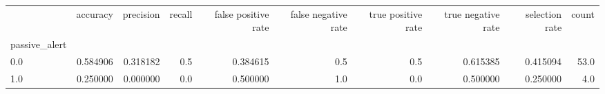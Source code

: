 \begin{tabular}{lrrrrrrrrr}
\toprule
{} &  accuracy &  precision &  recall &  false positive rate &  false negative rate &  true positive rate &  true negative rate &  selection rate &  count \\
passive\_alert &           &            &         &                      &                      &                     &                     &                 &        \\
\midrule
0.0           &  0.584906 &   0.318182 &     0.5 &             0.384615 &                  0.5 &                 0.5 &            0.615385 &        0.415094 &   53.0 \\
1.0           &  0.250000 &   0.000000 &     0.0 &             0.500000 &                  1.0 &                 0.0 &            0.500000 &        0.250000 &    4.0 \\
\bottomrule
\end{tabular}
